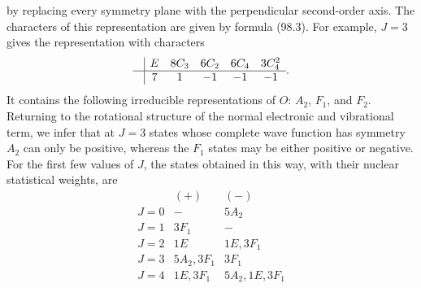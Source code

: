 by replacing every symmetry plane with the perpendicular second-order axis. The characters of this representation are given by formula (98.3). For example, $J=3$ gives the representation with characters
\[
\begin{array}{c|ccccc}&E&8C_3&6C_2&6C_4&3C_4^2\\\hline&7&1&-1&-1&-1\end{array}.
\]
It contains the following irreducible representations of $O$: $A_2$, $F_1$, and $F_2$. Returning to the rotational structure of the normal electronic and vibrational term, we infer that at $J=3$ states whose complete wave function has symmetry $A_2$ can only be positive, whereas the $F_1$ states may be either positive or negative. For the first few values of $J$, the states obtained in this way, with their nuclear statistical weights, are
\[
\begin{array}{c|cc}&(+)&(-)\\\hline
J=0&-&5A_2\\
J=1&3F_1&-\\
J=2&1E&1E,3F_1\\
J=3&5A_2,3F_1&3F_1\\
J=4&1E,3F_1&5A_2,1E,3F_1
\end{array}
\]
